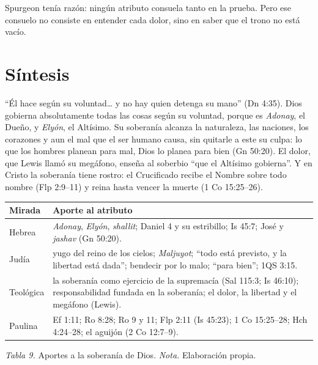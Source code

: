 Spurgeon tenía razón: ningún atributo consuela tanto en la prueba. Pero ese consuelo no consiste en entender cada dolor, sino en saber que el trono no está vacío.

\section{Síntesis}

``Él hace según su voluntad\ldots{} y no hay quien detenga su mano'' (Dn 4:35). Dios gobierna absolutamente todas las cosas según su voluntad, porque es \emph{Adonay}, el Dueño, y \emph{Elyón}, el Altísimo. Su soberanía alcanza la naturaleza, las naciones, los corazones y aun el mal que el ser humano causa, sin quitarle a este su culpa: lo que los hombres planean para mal, Dios lo planea para bien (Gn 50:20). El dolor, que Lewis llamó su megáfono, enseña al soberbio ``que el Altísimo gobierna''. Y en Cristo la soberanía tiene rostro: el Crucificado recibe el Nombre sobre todo nombre (Flp 2:9--11) y reina hasta vencer la muerte (1 Co 15:25--26).

\begin{center}\small\renewcommand{\arraystretch}{1.18}
\begin{tabular}{@{}L{2.8cm}L{11.0cm}@{}}
\toprule
\textbf{Mirada} & \textbf{Aporte al atributo} \\ \midrule
Hebrea & \emph{Adonay}, \emph{Elyón}, \emph{shallit}; Daniel 4 y su estribillo; Is 45:7; José y \emph{jashav} (Gn 50:20). \\
Judía & yugo del reino de los cielos; \emph{Maljuyot}; ``todo está previsto, y la libertad está dada''; bendecir por lo malo; ``para bien''; 1QS 3:15. \\
Teológica & la soberanía como ejercicio de la supremacía (Sal 115:3; Is 46:10); responsabilidad fundada en la soberanía; el dolor, la libertad y el megáfono (Lewis). \\
Paulina & Ef 1:11; Ro 8:28; Ro 9 y 11; Flp 2:11 (Is 45:23); 1 Co 15:25--28; Hch 4:24--28; el aguijón (2 Co 12:7--9). \\
\bottomrule
\end{tabular}\par
{\footnotesize\color{gris}\textit{Tabla 9.} Aportes a la soberanía de Dios. \textit{Nota.} Elaboración propia.}
\end{center}

